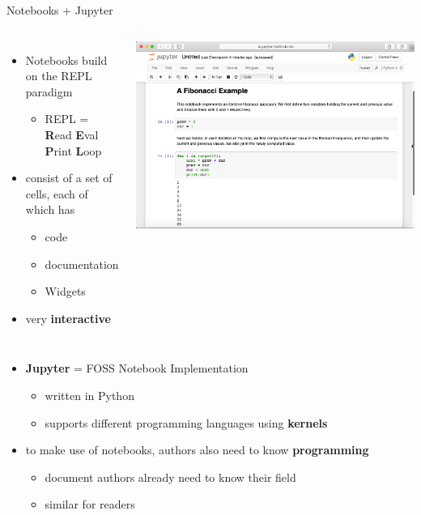 \documentclass{beamer}
\begin{document}
    \begin{frame}{Notebooks + Jupyter}
        \begin{columns}
            \begin{itemize}
                \item Notebooks build on the REPL paradigm
                \begin{itemize}
                    \item REPL = \textbf{R}ead \textbf{E}val \textbf{P}rint \textbf{L}oop
                \end{itemize}
                \item consist of a set of cells, each of which has
                \begin{itemize}
                    \item code
                    \item documentation
                    \item Widgets
                \end{itemize}
                \item very \textbf{interactive}
            \end{itemize}
            \includegraphics[scale=0.2]{images/notebook}
        \end{columns}

        \begin{itemize}
            \item \textbf{Jupyter} = FOSS Notebook Implementation
                \begin{itemize}
                    \item written in Python
                    \item supports different programming languages using \textbf{kernels}
                \end{itemize}
            \item to make use of notebooks, authors also need to know \textbf{programming}
                \begin{itemize}
                    \item document authors already need to know their field
                    \item similar for readers
                \end{itemize}
        

\end{itemize}
\end{frame}
\end{document}
